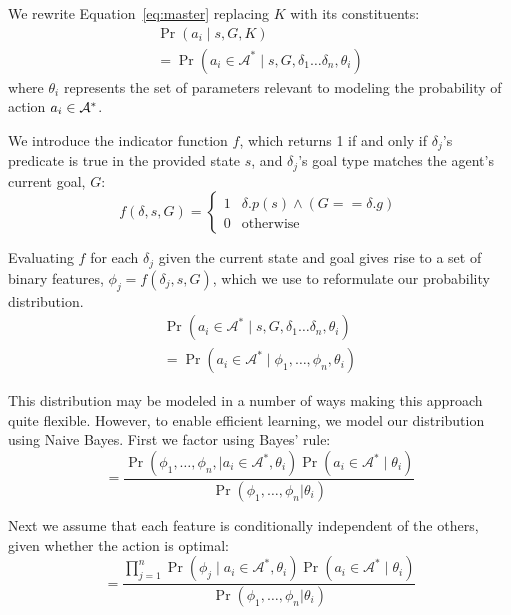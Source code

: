\documentclass[letterpaper]{article}
\begin{document}
We rewrite Equation~\ref{eq:master} replacing $K$ with its constituents:
\begin{multline}
\Pr(a_i \mid s, G, K) \\
= \Pr(a_i \in \mathcal{A}^* \mid s, G, \delta_1 \ldots \delta_n, \theta_i)
\end{multline}
\noindent where $\theta_i$ represents the set of parameters relevant to modeling
the probability of action $a_i \in {\cal A}^*$. 

We introduce the indicator function $f$, which returns 1 if and only if $\delta_j$'s predicate is true in the provided state $s$, and $\delta_j$'s goal type matches the agent's current goal, $G$:
\begin{equation}
f(\delta, s, G) = 
\begin{cases}
1& \delta.p(s) \wedge (G == \delta.g) \\
0& \text{otherwise}
\end{cases}
\label{eq:f_func_def}
\end{equation}

Evaluating $f$ for each $\delta_j$ given the current state and goal gives rise to a set of binary features,
$\phi_j = f(\delta_j, s, G)$, which we use to reformulate our probability distribution.
\begin{multline}
\Pr(a_i \in \mathcal{A}^*  \mid s, G, \delta_1 \ldots \delta_n, \theta_i) \\
= \Pr(a_i \in \mathcal{A}^*  \mid \phi_1, \ldots, \phi_n, \theta_i)
\label{eq:feature_rep}
\end{multline}

This distribution may be modeled in a number of ways making this
approach quite flexible. However, to enable efficient learning, we model our distribution using Naive
Bayes. First we factor using Bayes' rule:
\begin{equation}
= \frac{\Pr(\phi_1, \ldots, \phi_{n}, \mid a_i \in \mathcal{A}^*, \theta_i) \Pr(a_i \in \mathcal{A}^* \mid \theta_i)}{\Pr(\phi_1, \ldots, \phi_{n} | \theta_i)}
\label{eq:bayes}
\end{equation}

Next we assume that each feature is conditionally independent of the others, given whether the action is optimal:
\begin{equation}
= \frac{\prod_{j=1}^{n} \Pr(\phi_j \mid a_i \in \mathcal{A}^*, \theta_i) \Pr(a_i \in \mathcal{A}^* \mid \theta_i) }{\Pr(\phi_1, \ldots, \phi_{n} | \theta_i)}
\label{eq:final}
\end{equation}
\end{document}
